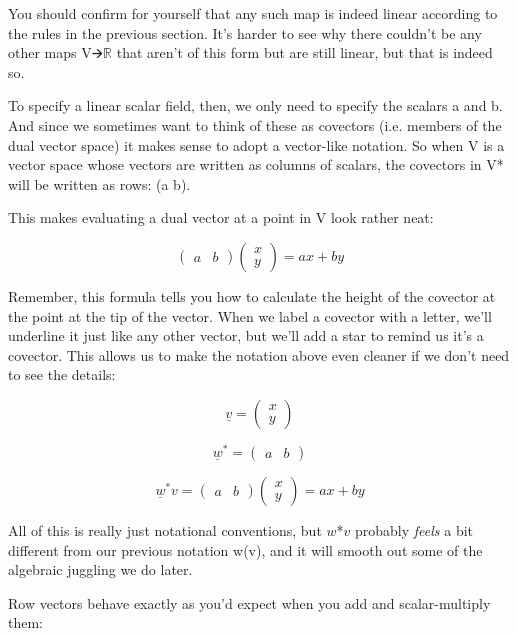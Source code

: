 \documentclass[oneside,english]{amsbook}
\numberwithin{section}{chapter}
\theoremstyle{plain}
\theoremstyle{definition}
\begin{document}
You should confirm for yourself that any such map is indeed linear
according to the rules in the previous section. It's harder to see why
there couldn't be any other maps V🡪$\mathbb{R}$ that aren't of this form
but are still linear, but that is indeed so.

To specify a linear scalar field, then, we only need to specify the
scalars a and b. And since we sometimes want to think of these as
covectors (i.e. members of the dual vector space) it makes sense to
adopt a vector-like notation. So when V is a vector space whose vectors
are written as columns of scalars, the covectors in V* will be written
as rows: (a b).

This makes evaluating a dual vector at a point in V look rather neat:

\[\begin{pmatrix}
	a & b
\end{pmatrix}\begin{pmatrix}
	x \\
	y
\end{pmatrix} = ax + by\]

Remember, this formula tells you how to calculate the height of the
covector at the point at the tip of the vector. When we label a covector
with a letter, we'll underline it just like any other vector, but we'll
add a star to remind us it's a covector. This allows us to make the
notation above even cleaner if we don't need to see the details:

\[\underline{v} = \begin{pmatrix}
	x \\
	y
\end{pmatrix}\]

\[{\underline{w}}^{*} = \begin{pmatrix}
	a & b
\end{pmatrix}\]

\[{\underline{w}}^{*}v = \begin{pmatrix}
	a & b
\end{pmatrix}\begin{pmatrix}
	x \\
	y
\end{pmatrix} = ax + by\]

All of this is really just notational conventions, but $w$*$v$
probably \emph{feels} a bit different from our previous notation w(v),
and it will smooth out some of the algebraic juggling we do later.

Row vectors behave exactly as you'd expect when you add and
scalar-multiply them:
\end{document}
